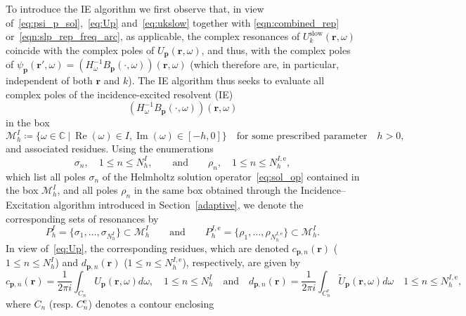 \documentclass[11pt]{article}
\theoremstyle{plain}
\theoremstyle{remark}
\def \C{\mathbb{C}}
\def \br{\mathbf{r}}
\def \bp{\mathbf{p}}
\renewcommand{\Re}{\operatorname{Re}}
\renewcommand{\Im}{\operatorname{Im}}
\begin{document}
To introduce the IE algorithm we first observe that, in view
of~\eqref{eq:psi_p_sol},~\eqref{eq:Up} and~\eqref{eq:ukslow} together
with \eqref{eqn:combined_rep} or~\eqref{eqn:slp_rep_freq_arc}, as
applicable, the complex resonances of
$U_k^{\mathrm{slow}}(\br,\omega)$ coincide with the complex poles of
$U_\bp(\br,\omega)$, and thus, with the complex poles of
$\psi_\bp(\br',\omega) =
\left(H_\omega^{-1}B_\bp(\cdot,\omega)\right)(\br,\omega)$ (which
therefore are, in particular, independent of both $\br$ and $k$). The
IE algorithm thus seeks to evaluate all complex poles of the
incidence-excited resolvent (IE)
\begin{equation}
  \label{eq:inc_exc}
  \left(H_\omega^{-1}B_\bp(\cdot,\omega)\right)(\br,\omega)
\end{equation}
in the box
\begin{equation}
  \label{eq:box}
  \mathcal{M}^I_h \coloneqq \{\omega \in \C \ | \ \Re(\omega) \in I,
  \Im(\omega) \in [-h,0]\}\quad\mbox{for some prescribed parameter}\quad h > 0,
\end{equation}
and associated residues. Using the enumerations
\begin{equation}
  \label{eq:nih}
  \sigma_n,\quad 1\leq n\leq N_h^{I},\qquad\mbox{and}\qquad \rho_n,\quad
  1 \le n \le N_h^{I,\mathrm{e}},
\end{equation}
which list all poles $\sigma_n$ of the Helmholtz solution
operator~\eqref{eq:sol_op} contained in the box $\mathcal{M}^I_h$, and
all poles $\rho_n$ in the same box obtained through the
Incidence–Excitation algorithm introduced in Section~\ref{adaptive},
we denote the corresponding sets of resonances by
\begin{equation}\label{eqn:inc_res}
  P^I_h = \{\sigma_1,\dots,\sigma_{N_h^{I}}\}\subset \mathcal{M}^I_h \qquad \text{and}\qquad P_{h}^{I,\mathrm{e}} = \{\rho_1,\dots,\rho_{N_h^{I,\mathrm{e}}}\}\subset \mathcal{M}^I_h.
\end{equation}
In view of~\eqref{eq:Up}, the corresponding residues, which are
denoted $c_{\bp,n}(\br)$ ($1\leq n\leq N_h^{I}$) and
$d_{\bp,n}(\br)$ ($1\leq n\leq N_h^{I,\mathrm{e}}$), respectively, are given by
\begin{equation}\label{eqn:res}
   c_{\bp,n}(\br) = \frac{1}{2\pi i}\int_{C_n} U_\bp(\br,\omega)d\omega,\quad 1\leq n\leq N_h^{I} \quad\text{and}\quad d_{\bp,n}(\br) = \frac{1}{2\pi i}\int_{C_n^\mathrm{e}} \widetilde{U}_\bp(\br,\omega)d\omega\quad 1\leq n\leq N_h^{I,\mathrm{e}},
\end{equation}
where $C_n$ (resp. $C_n^\mathrm{e}$) denotes a contour enclosing
\end{document}
